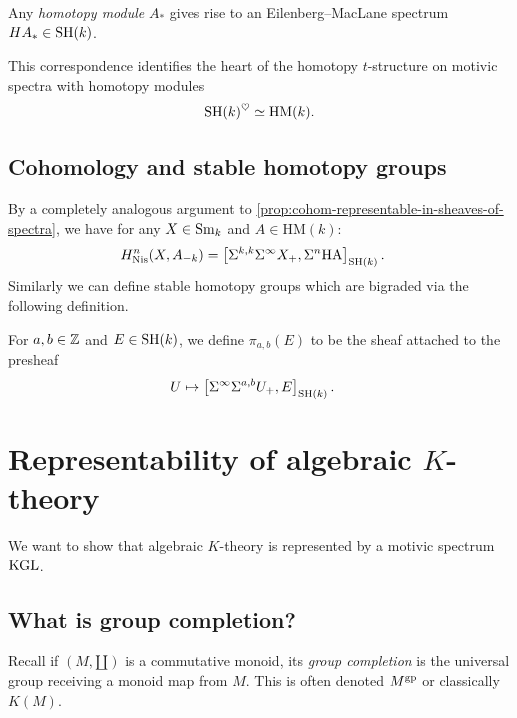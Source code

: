 \documentclass[11pt,openany]{book}
\providecommand{\HM}{\mathrm{HM}}
\providecommand{\HA}{\mathrm{HA}}
\begin{document}
\begin{proposition} Any \textit{homotopy module} $A_\ast$ gives rise to an Eilenberg--MacLane spectrum $HA_\ast \in \mathrm{SH}(k)$.
\end{proposition}

This correspondence identifies the heart of the homotopy $t$-structure on motivic spectra with homotopy modules
\begin{align*}
    \SH(k)^\heart \simeq \HM(k).
\end{align*}
%

\subsection{Cohomology and stable homotopy groups}

By a completely analogous argument to \autoref{prop:cohom-representable-in-sheaves-of-spectra}, we have for any $X\in \mathrm{Sm}_k$ and $A \in \HM(k)$:
\begin{align*}
    H^n_\Nis(X, A_{-k}) &= \left[ \Sigma^{k,k}\Sigma^\infty X_+, \Sigma^n\HA \right]_{\SH(k)}.
\end{align*}
Similarly we can define stable homotopy groups which are bigraded via the following definition.

\begin{definition} For $a,b\in \mathbb{Z}$ and $E \in \mathrm{SH}(k)$, we define $\pi_{a,b}(E)$ to be the sheaf attached to the presheaf
\begin{align*}
    U &\mapsto \left[ \Sigma^\infty \Sigma^{a,b} U_+, E \right]_{\mathrm{SH}(k)}.
\end{align*}
\end{definition}

\section{Representability of algebraic \texorpdfstring{$K$}{K}-theory}

\begin{goal} We want to show that algebraic $K$-theory is represented by a motivic spectrum $\mathrm{KGL}$.
\end{goal}

\subsection{What is group completion?}

Recall if $(M,\amalg)$ is a commutative monoid, its \textit{group completion} is the universal group receiving a monoid map from $M$. This is often denoted $M^{\mathrm{gp}}$ or classically $K(M)$.
\end{document}
